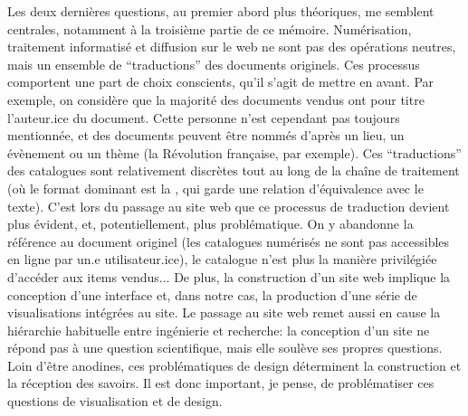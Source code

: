 Les deux dernières questions, au premier abord plus théoriques, me semblent centrales, notamment à la troisième partie de ce mémoire. Numérisation, traitement informatisé et diffusion sur le web ne sont pas des opérations neutres, mais un ensemble de \enquote{traductions} des documents originels. Ces processus comportent une part de choix conscients, qu'il s'agit de mettre en avant. Par exemple, on considère que la majorité des documents vendus ont pour titre l'auteur.ice du document. Cette personne n'est cependant pas toujours mentionnée, et des documents peuvent être nommés d'après un lieu, un évènement ou un thème (la Révolution française, par exemple). Ces \enquote{traductions} des catalogues sont relativement discrètes tout au long de la chaîne de traitement (où le format dominant est la \tei{}, qui garde une relation d'équivalence avec le texte). C'est lors du  passage au site web que ce processus de traduction devient plus évident, et, potentiellement, plus problématique. On y abandonne la référence au document originel (les catalogues numérisés ne sont pas accessibles en ligne par un.e utilisateur.ice), le catalogue n'est plus la manière privilégiée d'accéder aux items vendus... De plus, la construction d'un site web implique la conception d'une interface et, dans notre cas, la production d'une série de visualisations intégrées au site. Le passage au site web remet aussi en cause la hiérarchie habituelle entre ingénierie et recherche: la conception d'un site ne répond pas à une question scientifique, mais elle soulève ses propres questions. Loin d'être anodines, ces problématiques de design déterminent la construction et la réception des savoirs. Il est donc important, je pense, de problématiser ces questions de visualisation et de design.